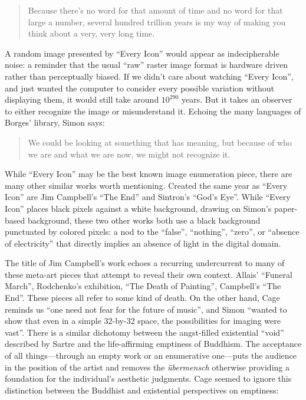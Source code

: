 \documentclass{thesis}
\begin{document}
	\begin{quote}
	Because there's no word for that amount of time and no word for that large a number, several hundred trillion years is my way of making you think about a very, very long time.
	\end{quote}
	
A random image presented by ``Every Icon'' would appear as indecipherable noise: a reminder that the usual ``raw'' raster image format is hardware driven rather than perceptually biased. If we didn't care about watching ``Every Icon'', and just wanted the computer to consider every possible variation without displaying them, it would still take around $10^{290}$ years. But it takes an observer to either recognize the image or misunderstand it. Echoing the many languages of Borges' library, Simon says:
	
	\begin{quote}
	We could be looking at something that has meaning, but because of who we are and what we are now, we might not recognize it.
	\end{quote}
	
While ``Every Icon'' may be the best known image enumeration piece, there are many other similar works worth mentioning. Created the same year as ``Every Icon'' are Jim Campbell's ``The End''\cite{jim_campbell_end_1996} and Sintron's ``God's Eye''\cite{sintron_gods_2003}. While ``Every Icon'' places black pixels against a white background, drawing on Simon's paper-based background, these two other works both use a black background punctuated by colored pixels: a nod to the ``false'', ``nothing'', ``zero'',  or ``absence of electricity'' that directly implies an absence of light in the digital domain.
	
The title of Jim Campbell's work echoes a recurring undercurrent to many of these meta-art pieces that attempt to reveal their own context. Allais' ``Funeral March'', Rodchenko's exhibition, ``The Death of Painting'', Campbell's ``The End''. These pieces all refer to some kind of death. On the other hand, Cage reminds us ``one need not fear for the future of music'', and Simon ``wanted to show that even in a simple 32-by-32 space, the possibilities for imaging were vast''\cite{matthew_mirapaul_in_1997}. There is a similar dichotomy between the angst-filled existential ``void'' described by Sartre\cite{sartre_being_1993} and the life-affirming emptiness of Buddhism. The acceptance of all things---through an empty work or an enumerative one---puts the audience in the position of the artist and removes the \emph{\"ubermensch} otherwise providing a foundation for the individual's aesthetic judgments. Cage seemed to ignore this distinction between the Buddhist and existential perspectives on emptiness:
	
\end{document}
